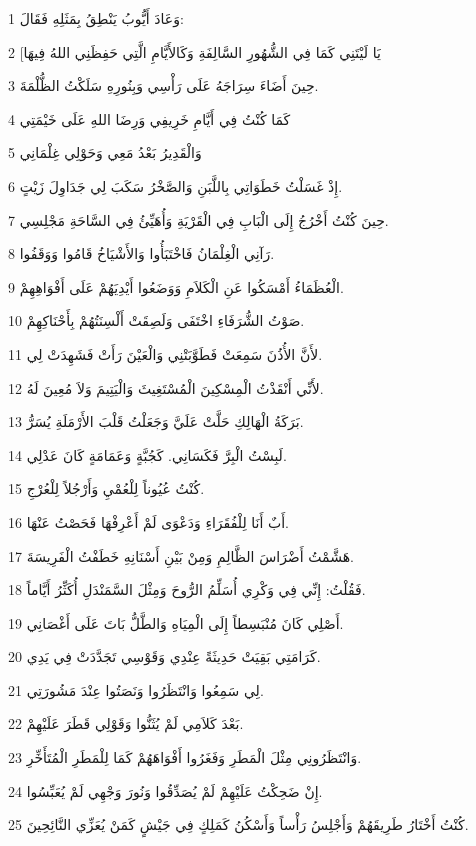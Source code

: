 \par 1 وَعَادَ أَيُّوبُ يَنْطِقُ بِمَثَلِهِ فَقَالَ:
\par 2 [يَا لَيْتَنِي كَمَا فِي الشُّهُورِ السَّالِفَةِ وَكَالأَيَّامِ الَّتِي حَفِظَنِي اللهُ فِيهَا
\par 3 حِينَ أَضَاءَ سِرَاجَهُ عَلَى رَأْسِي وَبِنُورِهِ سَلَكْتُ الظُّلْمَةَ.
\par 4 كَمَا كُنْتُ فِي أَيَّامِ خَرِيفِي وَرِضَا اللهِ عَلَى خَيْمَتِي
\par 5 وَالْقَدِيرُ بَعْدُ مَعِي وَحَوْلِي غِلْمَانِي
\par 6 إِذْ غَسَلْتُ خَطَوَاتِي بِاللَّبَنِ وَالصَّخْرُ سَكَبَ لِي جَدَاوِلَ زَيْتٍ.
\par 7 حِينَ كُنْتُ أَخْرُجُ إِلَى الْبَابِ فِي الْقَرْيَةِ وَأُهَيِّئُ فِي السَّاحَةِ مَجْلِسِي.
\par 8 رَآنِي الْغِلْمَانُ فَاخْتَبَأُوا وَالأَشْيَاخُ قَامُوا وَوَقَفُوا.
\par 9 الْعُظَمَاءُ أَمْسَكُوا عَنِ الْكَلاَمِ وَوَضَعُوا أَيْدِيَهُمْ عَلَى أَفْوَاهِهِمْ.
\par 10 صَوْتُ الشُّرَفَاءِ اخْتَفَى وَلَصِقَتْ أَلْسِنَتُهُمْ بِأَحْنَاكِهِمْ.
\par 11 لأَنَّ الأُذُنَ سَمِعَتْ فَطَوَّبَتْنِي وَالْعَيْنَ رَأَتْ فَشَهِدَتْ لِي.
\par 12 لأَنِّي أَنْقَذْتُ الْمِسْكِينَ الْمُسْتَغِيثَ وَالْيَتِيمَ وَلاَ مُعِينَ لَهُ.
\par 13 بَرَكَةُ الْهَالِكِ حَلَّتْ عَلَيَّ وَجَعَلْتُ قَلْبَ الأَرْمَلَةِ يُسَرُّ.
\par 14 لَبِسْتُ الْبِرَّ فَكَسَانِي. كَجُبَّةٍ وَعَمَامَةٍ كَانَ عَدْلِي.
\par 15 كُنْتُ عُيُوناً لِلْعُمْيِ وَأَرْجُلاً لِلْعُرْجِ.
\par 16 أَبٌ أَنَا لِلْفُقَرَاءِ وَدَعْوَى لَمْ أَعْرِفْهَا فَحَصْتُ عَنْهَا.
\par 17 هَشَّمْتُ أَضْرَاسَ الظَّالِمِ وَمِنْ بَيْنِ أَسْنَانِهِ خَطَفْتُ الْفَرِيسَةَ.
\par 18 فَقُلْتُ: إِنِّي فِي وَكْرِي أُسَلِّمُ الرُّوحَ وَمِثْلَ السَّمَنْدَلِ أُكَثِّرُ أَيَّاماً.
\par 19 أَصْلِي كَانَ مُنْبَسِطاً إِلَى الْمِيَاهِ وَالطَّلُّ بَاتَ عَلَى أَغْصَانِي.
\par 20 كَرَامَتِي بَقِيَتْ حَدِيثَةً عِنْدِي وَقَوْسِي تَجَدَّدَتْ فِي يَدِي.
\par 21 لِي سَمِعُوا وَانْتَظَرُوا وَنَصَتُوا عِنْدَ مَشُورَتِي.
\par 22 بَعْدَ كَلاَمِي لَمْ يُثَنُّوا وَقَوْلِي قَطَرَ عَلَيْهِمْ.
\par 23 وَانْتَظَرُونِي مِثْلَ الْمَطَرِ وَفَغَرُوا أَفْوَاهَهُمْ كَمَا لِلْمَطَرِ الْمُتَأَخِّرِ.
\par 24 إِنْ ضَحِكْتُ عَلَيْهِمْ لَمْ يُصَدِّقُوا وَنُورَ وَجْهِي لَمْ يُعَبِّسُوا.
\par 25 كُنْتُ أَخْتَارُ طَرِيقَهُمْ وَأَجْلِسُ رَأْساً وَأَسْكُنُ كَمَلِكٍ فِي جَيْشٍ كَمَنْ يُعَزِّي النَّائِحِينَ.

